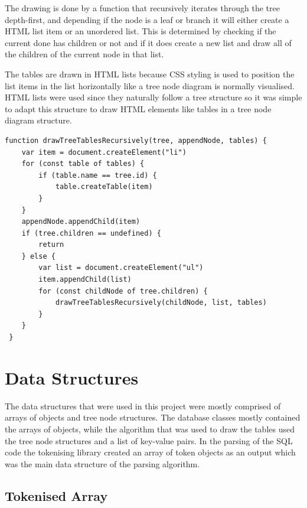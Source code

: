 The drawing is done by a function that recursively iterates through the tree depth-first, and depending if the node is a leaf or branch it will either create a HTML list item or an unordered list. This is determined by checking if the current done has children or not and if it does create a new list and draw all of the children of the current node in that list. 

The tables are drawn in HTML lists because CSS styling is used to position the list items in the list horizontally like a tree node diagram is normally visualised. HTML lists were used since they naturally follow a tree structure so it was simple to adapt this structure to draw HTML elements like tables in a tree node diagram structure. 

 \begin{lstlisting}[style=JavaScript, caption={JavaScript function that draws a list of tables recursively in HTML list elements.}]
 function drawTreeTablesRecursively(tree, appendNode, tables) {
 	var item = document.createElement("li")
 	for (const table of tables) {
 		if (table.name == tree.id) {
 			table.createTable(item)
 		}
 	}
 	appendNode.appendChild(item)
 	if (tree.children == undefined) {
 		return
 	} else {
 		var list = document.createElement("ul")
 		item.appendChild(list)
 		for (const childNode of tree.children) {
 			drawTreeTablesRecursively(childNode, list, tables)
 		}
 	}
 }
\end{lstlisting}

\section{Data Structures}

The data structures that were used in this project were mostly comprised of arrays of objects and tree node structures. The database classes mostly contained the arrays of objects, while the algorithm that was used to draw the tables used the tree node structures and a list of key-value pairs. In the parsing of the SQL code the tokenising library \cite{tokeniser} created an array of token objects as an output which was the main data structure of the parsing algorithm.

\subsection{Tokenised Array}

